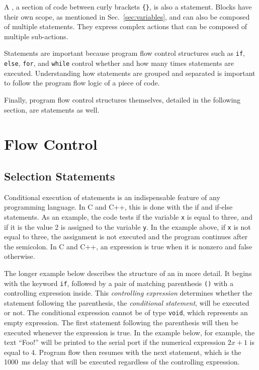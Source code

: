 A , a section of code between curly brackets \texttt{\{\}}, is also a statement.
Blocks have their own scope, as mentioned in Sec.~\ref{sec:variables}, and can also be composed of multiple statements.
They express complex actions that can be composed of multiple sub-actions.

Statements are important because program flow control structures such as \texttt{if}, \texttt{else}, \texttt{for}, and \texttt{while} control whether and how many times statements are executed.
Understanding how statements are grouped and separated is important to follow the program flow logic of a piece of code.

Finally, program flow control structures themselves, detailed in the following section, are statements as well.

\section{Flow Control}
\subsection{Selection Statements}
Conditional execution of statements is an indispensable feature of any programming language.
In C and C++, this is done with the if and if-else statements.
As an example, the code  tests if the variable \texttt{x} is equal to three, and if it is the value 2 is assigned to the variable \texttt{y}.
In the example above, if \texttt{x} is not equal to three, the assignment is not executed and the program continues after the semicolon.
In C and C++, an expression is true when it is nonzero and false otherwise.

The longer example below describes the structure of an  in more detail.
It begins with the keyword \texttt{if}, followed by a pair of matching parenthesis \texttt{()} with a controlling expression inside.
This \emph{controlling expression} determines whether the statement following the parenthesis, the \emph{conditional statement}, will be executed or not.
The conditional expression cannot be of type \texttt{void}, which represents an empty expression.
The first statement following the parenthesis will then be executed whenever the expression is true.
In the example below, for example, the text ``Foo!'' will be printed to the serial port if the numerical expression $2x + 1$ is equal to 4.
Program flow then resumes with the next statement, which is the \SI{1000}{ms} delay that will be executed regardless of the controlling expression.

